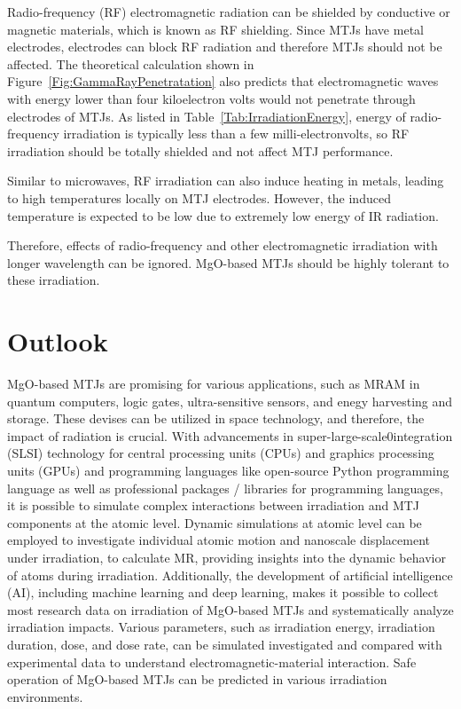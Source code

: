 \documentclass[molecules,review,submit,pdftex,moreauthors]{Definitions/mdpi}
\begin{document}
Radio-frequency (RF) electromagnetic radiation can be shielded by conductive or magnetic materials, which is known as RF shielding.  Since MTJs have metal electrodes, electrodes can block RF radiation and therefore MTJs should not be affected.  The theoretical calculation shown in Figure~\ref{Fig:GammaRayPenetratation} also predicts that electromagnetic waves with energy lower than four kiloelectron volts would not penetrate through electrodes of MTJs.  As listed in Table~\ref{Tab:IrradiationEnergy}, energy of radio-frequency irradiation is typically less than a few milli-electronvolts, so RF irradiation should be totally shielded and not affect MTJ performance.  


Similar to microwaves, RF irradiation can also induce heating in metals, leading to high temperatures locally on MTJ electrodes.  However, the induced temperature is expected to be low due to extremely low energy of IR radiation.  


Therefore, effects of radio-frequency and other electromagnetic irradiation with longer wavelength can be ignored.  MgO-based MTJs should be highly tolerant to these  irradiation.  


\section{Outlook}

MgO-based MTJs are promising for various applications, such as MRAM in quantum computers, logic gates, ultra-sensitive sensors, and enegy harvesting and storage.  These devises can be utilized in space technology, and therefore, the impact of radiation is crucial.  With advancements in super-large-scale0integration (SLSI) technology for central processing units (CPUs) and graphics processing units (GPUs) and programming languages like open-source Python programming language as well as professional packages / libraries for programming languages, it is possible to simulate  complex interactions between irradiation and MTJ components at the atomic level. Dynamic simulations at atomic level can be employed to investigate individual atomic motion and nanoscale displacement under irradiation, to calculate MR, providing insights into the dynamic behavior of atoms during irradiation.  Additionally, the development of artificial intelligence (AI),  including machine learning and deep learning, makes it possible to collect most research data on irradiation of MgO-based MTJs and systematically analyze irradiation impacts.  Various parameters, such as irradiation energy, irradiation duration,  dose, and dose rate, can be simulated investigated and compared with experimental data to understand electromagnetic-material interaction.  Safe operation of MgO-based MTJs can be predicted in various irradiation environments.
\end{document}
